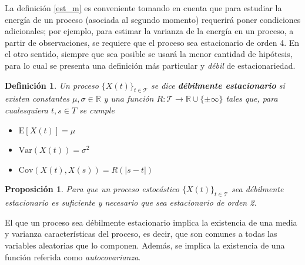 \documentclass[12pt,letterpaper]{book}
\newtheorem{definicion}{Definición}[chapter]
\newtheorem{proposicion}[teorema]{Proposición}
\newcommand{\R}{\mathbb{R}}
\newcommand{\E}[1]{\mathrm{E}\left[ #1 \right]}
\newcommand{\Var}[1]{\mathrm{Var}\left( #1 \right)}
\newcommand{\Cov}[1]{\mathrm{Cov}\left( #1 \right)}
\newcommand{\abso}[1]{\left| #1 \right|}
\newcommand{\xt}{$\{X(t)\}_{t\in \mathcal{T}}$ }
\begin{document}
La definición \ref{est_m} es conveniente tomando en cuenta que para estudiar la energía de un proceso (asociada al segundo momento) requerirá poner condiciones adicionales; por ejemplo, para estimar la varianza de la energía en un proceso, a partir de observaciones, se requiere que el proceso sea estacionario de orden 4.
%
En el otro sentido, siempre que sea posible se usará la menor cantidad de hipótesis, para lo cual se presenta una definición más particular y \textit{débil} de estacionariedad.

\begin{definicion}%
Un proceso \xt se dice \textbf{débilmente estacionario} si existen constantes $\mu, \sigma \in \R$ y una función $R : \mathcal{T} \rightarrow \R \cup \{ \pm \infty \} $ tales que, para cualesquiera $t, s \in T$ se 
cumple
\begin{itemize}
\item $\E{X(t)} = \mu$
\item $\Var{X(t)} = \sigma^{2}$
\item $\Cov{X(t),X(s)} = R(\abso{s-t})$
\end{itemize}
\end{definicion}

\begin{proposicion}
Para que un proceso estocástico \xt sea débilmente estacionario es suficiente y necesario que sea estacionario de orden 2.
\end{proposicion}

%

El que un proceso sea débilmente estacionario implica la existencia de una media y varianza características del proceso, es decir, que son comunes a todas las variables aleatorias que lo componen. 
%
Además, se implica la existencia de una función referida como \textit{autocovarianza}.
\end{document}
